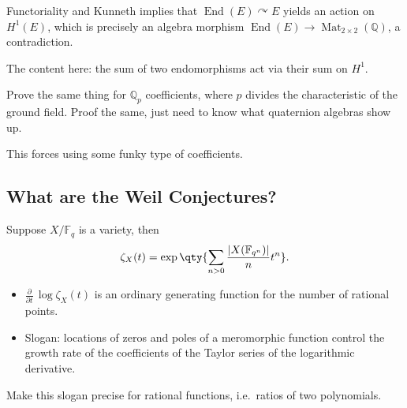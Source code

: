 \begin{exercise}

Functoriality and Kunneth implies that
\(\operatorname{End}(E)\curvearrowright E\) yields an action on
\(H^1(E)\), which is precisely an algebra morphism
\(\operatorname{End}(E) \to \operatorname{Mat}_{2\times 2}({\mathbb{Q}})\),
a contradiction.

The content here: the sum of two endomorphisms act via their sum on
\(H^1\).

\end{exercise}

\begin{exercise}

Prove the same thing for \({\mathbb{Q}}_p\) coefficients, where \(p\)
divides the characteristic of the ground field. Proof the same, just
need to know what quaternion algebras show up.

\end{exercise}

This forces using some funky type of coefficients.

\hypertarget{what-are-the-weil-conjectures-1}{%
\subsection{What are the Weil
Conjectures?}\label{what-are-the-weil-conjectures-1}}

Suppose \(X/{\mathbb{F}}_q\) is a variety, then
\begin{align*}  
\zeta_X(t) = \exp\qty{\sum_{n>0} { {{\left\lvert {X({\mathbb{F}}_{q^n})} \right\rvert} \over n} t^n } }
.\end{align*}

\begin{remark}

\envlist

\begin{itemize}
\item
  \({\frac{\partial }{\partial t}\,} \log \zeta_X(t)\) is an ordinary
  generating function for the number of rational points.
\item
  Slogan: locations of zeros and poles of a meromorphic function control
  the growth rate of the coefficients of the Taylor series of the
  logarithmic derivative.
\end{itemize}

\end{remark}

\begin{exercise}

Make this slogan precise for rational functions, i.e.~ratios of two
polynomials.

\end{exercise}

